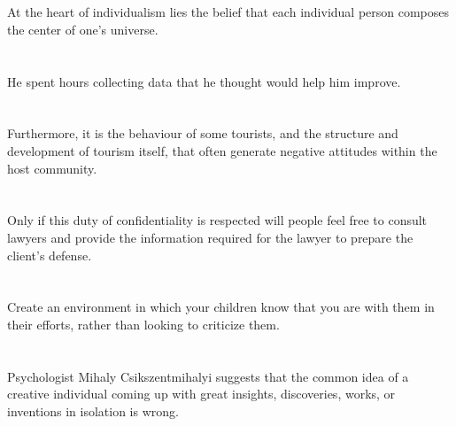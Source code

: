 \documentclass[a4paper, twocolumn]{oblivoir}
\begin{document}
    \section{}
    At the heart of individualism lies the belief that each individual person composes the center of one’s universe.

    \section{}
    He spent hours collecting data that he thought would help him improve.

    \section{}
    Furthermore, it is the behaviour of some tourists, and the structure and development of tourism itself, that often generate negative attitudes within the host community.
    \thispagestyle{secondstyle}
    
    \section{}
    Only if this duty of confidentiality is respected will people feel free to consult lawyers and provide the information required for the lawyer to prepare the client’s defense.

    \section{}
    Create an environment in which your children know that you are with them in their efforts, rather than looking to criticize them.

    \section{}
    Psychologist Mihaly Csikszentmihalyi suggests that the common idea of a creative individual coming up with
    great insights, discoveries, works, or inventions in isolation is wrong.
\end{document}
